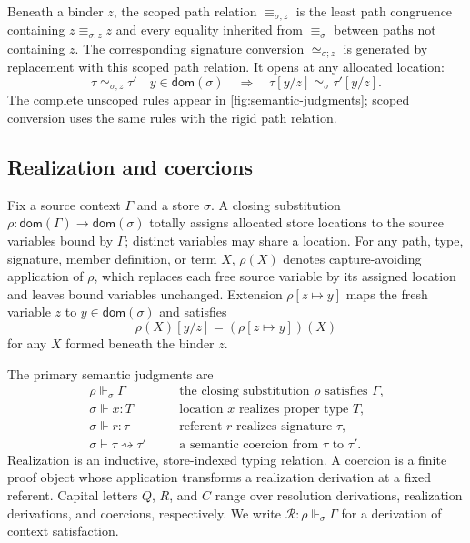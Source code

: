 \documentclass[acmsmall,screen,nonacm]{acmart}
\newcommand{\subst}[3]{#1[#2/#3]}
\newcommand{\realizes}{\Vdash}
\newcommand{\coerce}{\mathrel{\rightsquigarrow}}
\begin{document}
Beneath a binder \(z\), the scoped path relation
\(\equiv_{\sigma;z}\) is the least path congruence containing
\(z\equiv_{\sigma;z}z\) and every equality inherited from
\(\equiv_\sigma\) between paths not containing \(z\). The corresponding
signature conversion \(\simeq_{\sigma;z}\) is generated by replacement with
this scoped path relation. It opens at any allocated location:
\[
  \tau\simeq_{\sigma;z}\tau'
  \quad y\in\mathsf{dom}(\sigma)
  \quad\Longrightarrow\quad
  \subst{\tau}{y}{z}\simeq_\sigma\subst{\tau'}{y}{z}.
\]
The complete unscoped rules appear in
\cref{fig:semantic-judgments}; scoped conversion uses the same rules with the
rigid path relation.

\subsection{Realization and coercions}

Fix a source context \(\Gamma\) and a store \(\sigma\). A closing
substitution \(\rho:\mathsf{dom}(\Gamma)\longrightarrow\mathsf{dom}(\sigma)\)
totally assigns allocated store locations to the source variables bound by
\(\Gamma\); distinct variables may share a location. For any path, type,
signature, member definition, or term \(X\), \(\rho(X)\) denotes
capture-avoiding application of \(\rho\), which replaces each free source
variable by its assigned location and leaves bound variables unchanged.
Extension \(\rho[z\mapsto y]\) maps the fresh variable \(z\) to
\(y\in\mathsf{dom}(\sigma)\) and satisfies
\[
  \subst{\rho(X)}{y}{z}=(\rho[z\mapsto y])(X)
\]
for any \(X\) formed beneath the binder \(z\).

The primary semantic judgments are
\[
\begin{array}{lll}
\rho\realizes_\sigma\Gamma
  &\quad&\text{the closing substitution \(\rho\) satisfies \(\Gamma\),}\\
\sigma\realizes x:T
  &&\text{location \(x\) realizes proper type \(T\),}\\
\sigma\realizes r:\tau
  &&\text{referent \(r\) realizes signature \(\tau\),}\\
\sigma\vdash\tau\coerce\tau'
  &&\text{a semantic coercion from \(\tau\) to \(\tau'\).}
\end{array}
\]
Realization is an inductive, store-indexed typing relation. A coercion is a
finite proof object whose application transforms a realization derivation at
a fixed referent. Capital letters \(Q\), \(R\), and \(C\) range over
resolution derivations, realization derivations, and coercions, respectively.
We write \(\mathcal R:\rho\realizes_\sigma\Gamma\) for a derivation of context
satisfaction.
\end{document}
